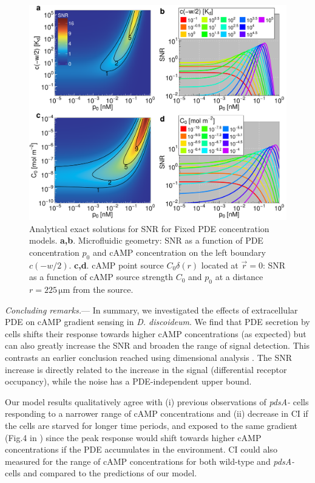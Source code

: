 \documentclass[%
 reprint,
 amsmath,amssymb,
 aps,prl,
 showpacs,
 linenumbers
]{revtex4-1}
\begin{document}
%
%
\begin{figure}
	\centering
	\includegraphics[scale=0.245]{../figures/fig4_analytical_pde_uniform_snr}
	\caption{
		\linespread{1.0}
		Analytical exact solutions for SNR for Fixed PDE concentration models.
		\textbf{a,b}. Microfluidic geometry: SNR as a function of PDE concentration $p_0$ and cAMP concentration on the left boundary $c(-w/2)$.
		\textbf{c,d}. cAMP point source $C_0 \delta(r)$ located at $\vec{r} = 0$: SNR as a function of cAMP source strength $C_0$ and $p_0$ at a distance $r = 225\,\mathrm{\mu m}$ from the source.
	}
	\label{fig:pde_uniform_analytical}
\end{figure}


%
%
\emph{Concluding remarks.}--- In summary, we investigated the effects of extracellular PDE on cAMP gradient sensing in \emph{D. discoideum}. We find that PDE secretion by cells shifts their response towards higher cAMP concentrations (as expected) but can also greatly increase the SNR and broaden the range of signal detection. This contrasts an earlier conclusion reached using dimensional analysis \cite{mechanism1}. The SNR increase is directly related to the increase in the signal (differential receptor occupancy), while the noise has a PDE-independent upper bound. 

Our model results qualitatively agree with (i) previous observations of \emph{pdsA-} cells responding to a narrower range of cAMP concentrations \cite{pdsA1} and (ii) decrease in CI if the cells are starved for longer time periods, and exposed to the same gradient (Fig.4 in \cite{fisherStatic}) since the peak response would shift towards higher cAMP concentrations if the PDE accumulates in the environment. CI could also measured for the range of cAMP concentrations for both wild-type and \emph{pdsA-} cells and compared to the predictions of our model.
\end{document}
